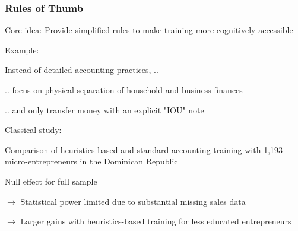 \documentclass[hideothersubsections, usenames,dvipsnames,11pt]{beamer}
\newenvironment{itemize_2pt}{\itemize\addtolength{\itemsep}{2pt}}{\enditemize}
\begin{document}
\begin{frame}[label=Drexler_thumb]
\frametitle{Rules of Thumb}

Core idea: Provide \textcolor{bdf}{simplified rules} to make training more cognitively accessible

\begin{itemize_2pt}
	
	\item Example: 
	\begin{itemize_2pt}
		\item Instead of detailed accounting practices, ..
		\item[] .. focus on \textcolor{bdf}{physical separation of household and business finances} 
		\item[] .. and only transfer money with an explicit \textcolor{bdf}{"IOU" note}
	\end{itemize_2pt}
	
	\vspace{1.0em}
	
	\item Classical study: \citet{Drexler2014}
	\begin{itemize_2pt}
		\item Comparison of heuristics-based and standard accounting training with 1,193 micro-entrepreneurs in the Dominican  Republic
		\item Null effect for full sample
		\item[] $\rightarrow$ Statistical power limited due to substantial missing sales data
		\item[] $\rightarrow$ \textcolor{bdf}{Larger gains with heuristics-based training for less educated entrepreneurs}
		
	\end{itemize_2pt}
\end{itemize_2pt}
\end{frame}
\end{document}

